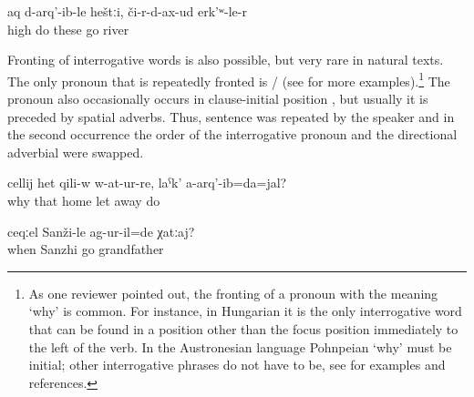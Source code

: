 \begin{exe}
\begin{xlist}
		\ex	\label{ex:We put up these (trousers) and go through the river A}
		\gll	aq	d-arq'-ib-le	heštːi,	či-r-d-ax-ud	erk'ʷ-le-r\\
			high	do	these	go	river\\	%
		\glt	{}
	\end{xlist}
\end{exe}

Fronting of interrogative words is also possible, but very rare in natural texts. The only pronoun that is repeatedly fronted is \slash{}   (see  for more examples).\footnote{As one reviewer pointed out, the fronting of a pronoun with the meaning `why' is common. For instance, in Hungarian it is the only interrogative word that can be found in a position other than the focus position immediately to the left of the verb. In the Austronesian language Pohnpeian ‘why' must be initial; other interrogative phrases do not have to be, see \citet{Dryer2005} for examples and references.} The pronoun   also occasionally occurs in clause-initial position , but usually it is preceded by spatial adverbs. Thus, sentence  was repeated by the speaker and in the second occurrence the order of the interrogative pronoun and the directional adverbial were swapped.
%
\begin{exe}
	\ex	\label{ex:‎Why did I leave him in the room and did not take him away}
	\gll	cellij	het	qili-w	w-at-ur-re,	laˁk'	a-arq'-ib=da=jal?\\
		why	that	home	let	away	do\\
	\glt	{}

	\ex	\label{ex:‎‎‎When did grandfather go to Sanzhi}
	\gll	ceqːel	Sanži-le	ag-ur-il=de	χatːaj?\\
		when	Sanzhi	go	grandfather\\
	\glt	{}
\end{exe}

